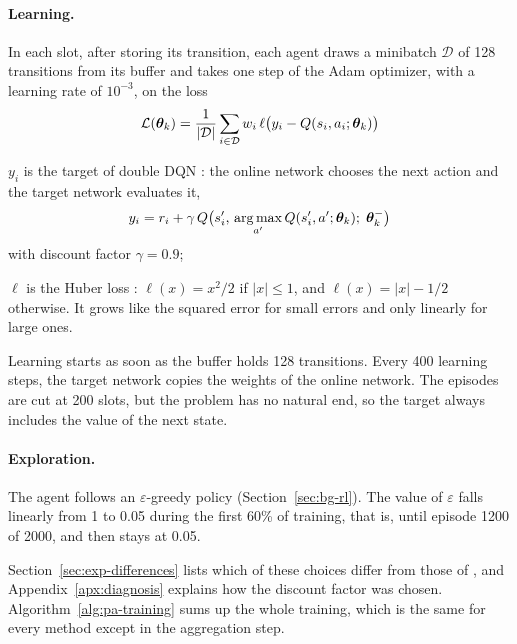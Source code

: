 \paragraph{Learning.} In each slot, after storing its transition, each agent draws a minibatch $\mathcal{D}$
of 128 transitions from its buffer and takes one step of the Adam optimizer, with a learning rate of
$10^{-3}$, on the loss
\begin{equation}
  \mathcal{L}(\bm{\theta}_k) = \frac{1}{|\mathcal{D}|} \sum_{i \in \mathcal{D}} w_i\,
    \ell\bigl( y_i - Q(s_i, a_i; \bm{\theta}_k) \bigr)
  \label{eq:pa-loss}
\end{equation}
\begin{wherelist}
  \item $y_i$ is the target of double \ac{DQN} \cite{vanhasselt+16double}: the online network chooses the
    next action and the target network evaluates it,
    \begin{equation}
      y_i = r_i + \gamma\, Q\bigl(s_i',\, \operatorname*{arg\,max}_{a'} Q(s_i', a'; \bm{\theta}_k);\; \bm{\theta}_k^{-}\bigr)
      \label{eq:pa-target}
    \end{equation}
    with discount factor $\gamma = 0.9$;
  \item $\ell$ is the Huber loss \cite{huber64robust}: $\ell(x) = x^2/2$ if $|x| \le 1$, and
    $\ell(x) = |x| - 1/2$ otherwise. It grows like the squared error for small errors and only linearly for
    large ones.
\end{wherelist}
Learning starts as soon as the buffer holds 128 transitions. Every 400 learning steps, the target network
copies the weights of the online network. The episodes are cut at 200 slots, but the problem has no natural
end, so the target always includes the value of the next state.

\paragraph{Exploration.} The agent follows an $\varepsilon$-greedy policy (Section~\ref{sec:bg-rl}). The
value of $\varepsilon$ falls linearly from 1 to 0.05 during the first 60\% of training, that is, until
episode 1200 of 2000, and then stays at 0.05.

Section~\ref{sec:exp-differences} lists which of these choices differ from those of \citet{li+22fedmarl},
and Appendix~\ref{apx:diagnosis} explains how the discount factor was chosen.
Algorithm~\ref{alg:pa-training} sums up the whole training, which is the same for every method except in
the aggregation step.

